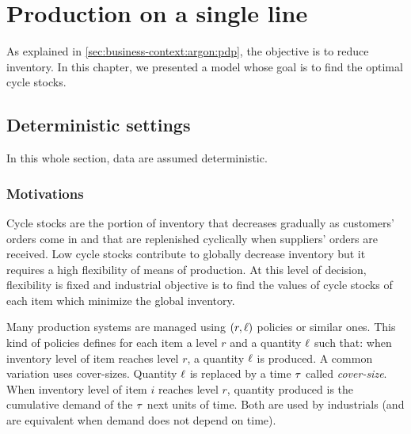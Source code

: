 \chapter{Production on a single line}
\label{chap:lot-size:single-line}






As explained in \cref{sec:business-context:argon:pdp}, the objective is to reduce inventory.
In this chapter, we presented a model whose goal is to find the optimal cycle stocks.


\section{Deterministic settings}
\label{sec:lot-size:single-line:deterministic}

In this whole section, data are assumed deterministic.


\subsection{Motivations}
\label{sec:lot-size:single-line:deterministic:motivations}


Cycle stocks are the portion of inventory that decreases gradually as customers’ orders come in and that are replenished cyclically when suppliers’ orders are received.
Low cycle stocks contribute to globally decrease inventory but it requires a high flexibility of means of production.
At this level of decision, flexibility is fixed and industrial objective is to find the values of cycle stocks of each item which minimize the global inventory.


Many production systems are managed using $(r,\ell)$ policies or similar ones.
This kind of policies defines for each item a level $r$ and a quantity $\ell$ such that: when inventory level of item reaches level $r$, a quantity $\ell$ is produced.
A common variation uses cover-sizes.
Quantity $\ell$ is replaced by a time $\tau$ called \emph{cover-size}.
When inventory level of item $i$ reaches level $r$, quantity produced is the cumulative demand of the $\tau$ next units of time.
Both are used by industrials (and are equivalent when demand does not depend on time).


